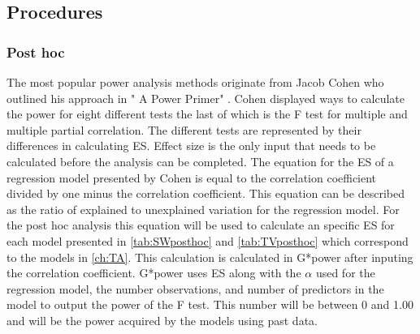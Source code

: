 \subsection{Procedures}
\subsubsection{Post hoc}

The most popular power analysis methods originate from Jacob Cohen who outlined his approach in " A Power Primer" \citep{cohen1992power}.
Cohen displayed ways to calculate the power for eight different tests the last of which is the F test for multiple and multiple partial correlation.
The different tests are represented by their differences in calculating ES.
Effect size is the only input that needs to be calculated before the analysis can be completed.
The equation for the ES of a regression model presented by Cohen is equal to the correlation coefficient divided by one minus the correlation coefficient.
This equation can be described as the ratio of explained to unexplained variation for the regression model.
For the post hoc analysis this equation will be used to calculate an specific ES for each model presented in \autoref{tab:SWposthoc} and \autoref{tab:TVposthoc} which correspond to the models in \autoref{ch:TA}.
 This calculation is calculated in G*power after inputing the correlation coefficient.
G*power uses ES along with the $\alpha$ used for the regression model, the number observations, and number of predictors in the model to output the power of the F test.
This number will be between 0 and 1.00 and will be the power acquired by the models using past data.

